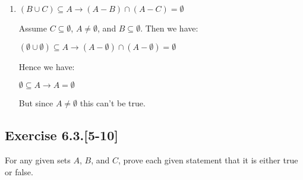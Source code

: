 \documentclass{article}
\newcommand{\cent}[1]{\begin{center}#1\end{center}}
\newcommand{\Exercise}[1]{\subsection*{Exercise #1}}
\begin{document}
\begin{enumerate}
		\item $ (B \cup C) \subseteq A \to (A-B) \cap (A-C) = \emptyset $
		
		Assume $C \subseteq \emptyset$, $A \neq \emptyset$, and $B \subseteq \emptyset$. Then we have:
		
		\cent{$ (\emptyset \cup \emptyset) \subseteq A \to (A-\emptyset) \cap (A-\emptyset) = \emptyset $}
		
		Hence we have:
		
		\cent{$ \emptyset \subseteq A \to A = \emptyset $}
		
		But since $A \neq \emptyset$ this can't be true.
		
 	\end{enumerate}
 	
 	\Exercise{6.3.[5-10]}
 	
 	For any given sets $A$, $B$, and $C$, prove each given statement that it is either true or false.
 	
\end{document}
